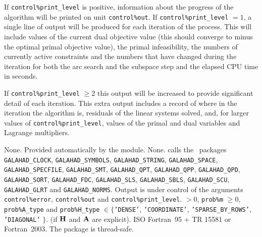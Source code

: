 \documentclass{galahad}
\newcommand{\packagename}{DQP}
\begin{document}
\galinfo
If {\tt control\%print\_level} is positive, information about the progress
of the algorithm will be printed on unit {\tt control\-\%out}.
If {\tt control\%print\_level} $= 1$, a single line of output will be produced
for each iteration of the process.
This will include values of the current dual objective value (this should
converge to minus the optimal primal objective value), the
primal infeasibility, the numbers of currently active constraints and the
numbers that have changed during the iteration for both the arc search and
the subspace step and the elapsed CPU time in seconds.

If {\tt control\%print\_level} $\geq 2$ this
output will be increased to provide significant detail of each iteration.
This extra output includes a record of where in the iteration the algorithm is,
residuals of the linear systems solved, and,
for larger values of {\tt control\%print\_level}, values of the primal and dual
variables and Lagrange multipliers.


\galgeneral

\galcommon None.
\galworkspace Provided automatically by the module.
\galroutines None.
\galmodules {\tt \packagename\_solve} calls the \galahad\ packages
{\tt GALAHAD\_CLOCK},
{\tt GALAHAD\_SY\-M\-BOLS},
{\tt GAL\-AHAD\-\_STRING},
{\tt GALAHAD\-\_SPACE},
{\tt GALAHAD\_SPECFILE},
{\tt GALAHAD\_SMT},
{\tt GALAHAD\_QPT},
{\tt GALAHAD\_QPP},
{\tt GALAHAD\_\-QPD},
{\tt GAL\-AHAD\_\-SORT},
{\tt GALAHAD\_\-FDC},
{\tt GALAHAD\_\-SLS},
{\tt GALAHAD\_\-SBLS},
{\tt GALAHAD\_\-SCU},
{\tt GALAHAD\-\_\-GLRT}
and
{\tt GALAHAD\-\_\-NORMS}.
\galio Output is under control of the arguments
 {\tt control\%error}, {\tt control\%out} and {\tt control\%print\_level}.
 $> 0$, {\tt prob\%m} $\geq  0$,
{\tt prob\%A\_type} and {\tt prob\%H\_type} $\in \{${\tt 'DENSE'},
 {\tt 'COORDINATE'}, {\tt 'SPARSE\_BY\_\-ROWS'}, {\tt 'DIAGONAL'} $\}$.
(if ${\mathbf{H}}$ and ${\mathbf{A}}$ are explicit).
\galportability ISO Fortran~95 + TR 15581 or Fortran~2003.
The package is thread-safe.

\end{document}
